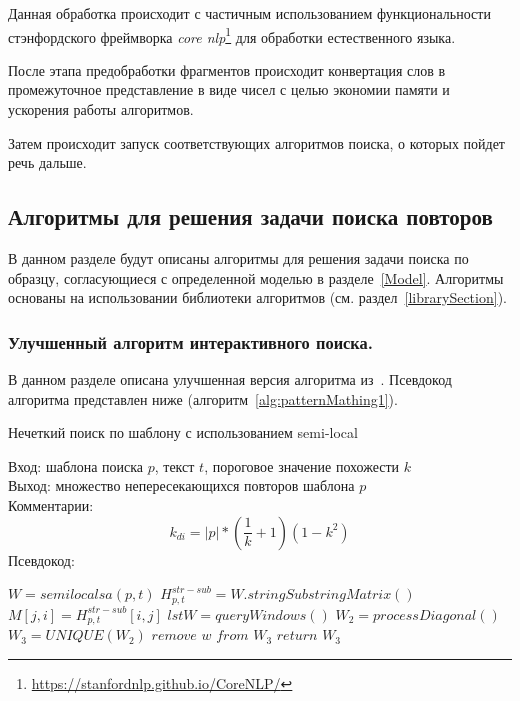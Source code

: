 Данная обработка происходит с частичным использованием функциональности стэнфордского  фреймворка \emph{core nlp}\footnote{\url{https://stanfordnlp.github.io/CoreNLP/}} для обработки естественного языка.

После этапа предобработки фрагментов происходит конвертация слов  в промежуточное представление в виде чисел с целью экономии памяти и ускорения работы алгоритмов.

Затем  происходит запуск соответствующих алгоритмов поиска, о которых пойдет речь дальше.


\subsection{Алгоритмы для решения задачи поиска повторов}\label{fics}

В данном разделе будут описаны алгоритмы для решения задачи поиска по образцу, согласующиеся с определенной моделью в разделе~\ref{Model}.
Алгоритмы основаны на использовании библиотеки алгоритмов (см. раздел~\ref{librarySection}).


\subsubsection{Улучшенный алгоритм интерактивного поиска.}

В данном разделе описана улучшенная версия алгоритма из~\cite{luciv2019interactive}. Псевдокод алгоритма представлен ниже (алгоритм~\ref{alg:patternMathing1}).

\begin{algorithm}[t!]
\caption{Нечеткий поиск по шаблону с использованием {semi-local}}\label{alg:patternMathing1}
Вход: шаблона поиска $p$, текст $t$, пороговое значение похожести $k$\\
Выход: множество непересекающихся повторов шаблона $p$\\
Комментарии:
\begin{equation}
    k_{di}=|p|*(\dfrac{1}{k}+1)(1-k^2)
\end{equation}
Псевдокод:
\begin{algorithmic}[1]
\State $W = semilocalsa(p,t)$
\State $ H^{str-sub}_{p,t} =  W.stringSubstringMatrix()$
\State $ M[j,i] = H^{str-sub}_{p,t}[i,j] $
\State $lstW = queryWindows()$
\State $W_2 = processDiagonal()$
\State $W_3 = UNIQUE(W_2)$
\State $remove$ $w$ $from$ $W_3$
\EndIf
\EndFor
\State $return$ $W_3$

\end{algorithmic}
\end{algorithm}

